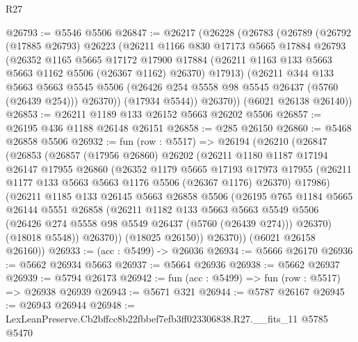 \begin{lexlean}{R27}
\begin{coremodule}
@26793 := @5546 @5506
@26847 := @26217
    (@26228
      (@26783
        (@26789
          (@26792
            (@17885 @26793)
            @26223
            (@26211
              @1166
              @830
              @17173
              @5665
              @17884
              @26793
              (@26352
                @1165
                @5665
                @17172
                @17900
                @17884
                (@26211 @1163 @133 @5663 @5663 @1162 @5506 (@26367 @1162) @26370)
                @17913)
              (@26211
                @344
                @133
                @5663
                @5663
                @5545
                @5506
                (@26426 @254 @5558 @98 @5545 @26437 (@5760 (@26439 @254)))
                @26370))
            (@17934 @5544))
          @26370))
      (@6021 @26138 @26140))
@26853 := @26211 @1189 @133 @26152 @5663 @26202 @5506
@26857 := @26195 @436 @1188 @26148 @26151
@26858 := @285 @26150
@26860 := @5468 @26858 @5506
@26932 := fun (row : @5517) =>
  @26194
    (@26210
      (@26847
        (@26853
          (@26857
            (@17956 @26860)
            @26202
            (@26211
              @1180
              @1187
              @17194
              @26147
              @17955
              @26860
              (@26352
                @1179
                @5665
                @17193
                @17973
                @17955
                (@26211 @1177 @133 @5663 @5663 @1176 @5506 (@26367 @1176) @26370)
                @17986)
              (@26211
                @1185
                @133
                @26145
                @5663
                @26858
                @5506
                (@26195
                  @765
                  @1184
                  @5665
                  @26144
                  @5551
                  @26858
                  (@26211
                    @1182
                    @133
                    @5663
                    @5663
                    @5549
                    @5506
                    (@26426 @274 @5558 @98 @5549 @26437 (@5760 (@26439 @274)))
                    @26370)
                  (@18018 @5548))
                @26370))
            (@18025 @26150))
          @26370))
      (@6021 @26158 @26160))
@26933 := (acc : @5499) -> @26036
@26934 := @5666 @26170
@26936 := @5662 @26934 @5663
@26937 := @5664 @26936
@26938 := @5662 @26937
@26939 := @5794 @26173
@26942 := fun (acc : @5499) => fun (row : @5517) => @26938 @26939
@26943 := @5671 @321
@26944 := @5787 @26167
@26945 := @26943 @26944
@26948 := LexLeanPreserve.Cb2bffcc8b22fbbef7efb3ff023306838.R27.__fits_11 @5785 @5470

\end{coremodule}
\end{lexlean}
